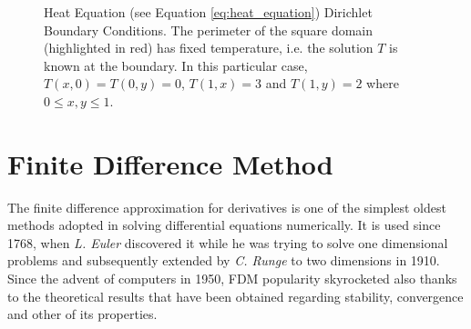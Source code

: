     \begin{center}
	\begin{figure}
    	 
    	\caption[Heat Equation - Dirichlet Boundary Conditions]{Heat Equation (see Equation \ref{eq:heat_equation}) Dirichlet Boundary Conditions. The perimeter of the square domain (highlighted in red) has fixed temperature, i.e. the solution $T$ is known at the boundary. In this particular case, $T(x,0)=T(0,y)=0$, $T(1,x)=3$ and $T(1,y)=2$ where $0\leq x,y\leq 1$. }
    	\label{fig:heat2d_bc}
	\end{figure}
\end{center} 

\section{Finite Difference Method}
The finite difference approximation for derivatives is one of the simplest oldest methods adopted in solving differential equations numerically. It is used since 1768, when \textit{L. Euler} discovered it while he was trying to solve one dimensional problems and subsequently extended by \textit{C. Runge} to two dimensions in 1910. Since the advent of computers in 1950, FDM  popularity skyrocketed also thanks to the theoretical results that have been obtained regarding stability, convergence and other of its properties.

